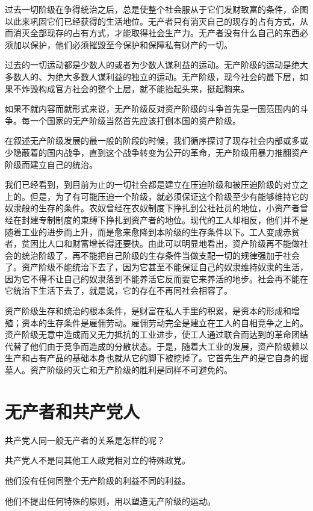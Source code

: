 \documentclass[UTF8]{ctexart}
\begin{document}
过去一切阶级在争得统治之后，总是使整个社会服从于它们发财致富的条件，企图以此来巩固它们已经获得的生活地位。无产者只有消灭自己的现存的占有方式，从而消灭全部现存的占有方式，才能取得社会生产力。无产者没有什么自己的东西必须加以保护，他们必须摧毁至今保护和保障私有财产的一切。

过去的一切运动都是少数人的或者为少数人谋利益的运动。无产阶级的运动是绝大多数人的、为绝大多数人谋利益的独立的运动。无产阶级，现今社会的最下层，如果不炸毁构成官方社会的整个上层，就不能抬起头来，挺起胸来。

如果不就内容而就形式来说，无产阶级反对资产阶级的斗争首先是一国范围内的斗争。每一个国家的无产阶级当然首先应该打倒本国的资产阶级。

在叙述无产阶级发展的最一般的阶段的时候，我们循序探讨了现存社会内部或多或少隐蔽着的国内战争，直到这个战争转变为公开的革命，无产阶级用暴力推翻资产阶级而建立自己的统治。

我们已经看到，到目前为止的一切社会都是建立在压迫阶级和被压迫阶级的对立之上的。但是，为了有可能压迫一个阶级，就必须保证这个阶级至少有能够维持它的奴隶般的生存的条件。农奴曾经在农奴制度下挣扎到公社社员的地位，小资产者曾经在封建专制制度的束缚下挣扎到资产者的地位。现代的工人却相反，他们并不是随着工业的进步而上升，而是愈来愈降到本阶级的生存条件以下。工人变成赤贫者，贫困比人口和财富增长得还要快。由此可以明显地看出，资产阶级再不能做社会的统治阶级了，再不能把自己阶级的生存条件当做支配一切的规律强加于社会了。资产阶级不能统治下去了，因为它甚至不能保证自己的奴隶维持奴隶的生活，因为它不得不让自己的奴隶落到不能养活它反而要它来养活的地步。社会再不能在它统治下生活下去了，就是说，它的存在不再同社会相容了。

资产阶级生存和统治的根本条件，是财富在私人手里的积累，是资本的形成和增殖；资本的生存条件是雇佣劳动。雇佣劳动完全是建立在工人的自相竞争之上的。资产阶级无意中造成而又无力抵抗的工业进步，使工人通过联合而达到的革命团结代替了他们由于竞争而造成的分散状态。于是，随着大工业的发展，资产阶级赖以生产和占有产品的基础本身也就从它的脚下被挖掉了。它首先生产的是它自身的掘墓人。资产阶级的灭亡和无产阶级的胜利是同样不可避免的。
\section{无产者和共产党人}
共产党人同一般无产者的关系是怎样的呢？

共产党人不是同其他工人政党相对立的特殊政党。

他们没有任何同整个无产阶级的利益不同的利益。

他们不提出任何特殊的原则，用以塑造无产阶级的运动。
\end{document}
